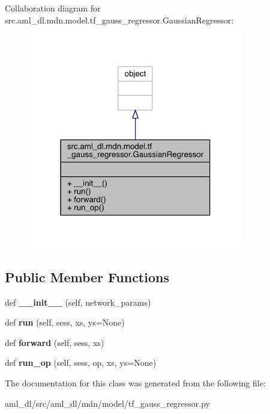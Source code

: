 Collaboration diagram for src.\+aml\+\_\+dl.\+mdn.\+model.\+tf\+\_\+gauss\+\_\+regressor.\+Gaussian\+Regressor\+:
\nopagebreak
\begin{figure}[H]
\begin{center}
\leavevmode
\includegraphics[width=267pt]{classsrc_1_1aml__dl_1_1mdn_1_1model_1_1tf__gauss__regressor_1_1_gaussian_regressor__coll__graph}
\end{center}
\end{figure}
\subsection*{Public Member Functions}
\begin{DoxyCompactItemize}
\item 
\hypertarget{classsrc_1_1aml__dl_1_1mdn_1_1model_1_1tf__gauss__regressor_1_1_gaussian_regressor_a4c80b2988737f5105daa84594d985724}{}\label{classsrc_1_1aml__dl_1_1mdn_1_1model_1_1tf__gauss__regressor_1_1_gaussian_regressor_a4c80b2988737f5105daa84594d985724} 
def {\bfseries \+\_\+\+\_\+init\+\_\+\+\_\+} (self, network\+\_\+params)
\item 
\hypertarget{classsrc_1_1aml__dl_1_1mdn_1_1model_1_1tf__gauss__regressor_1_1_gaussian_regressor_acc12f8257e881010aa7b96fe959456dd}{}\label{classsrc_1_1aml__dl_1_1mdn_1_1model_1_1tf__gauss__regressor_1_1_gaussian_regressor_acc12f8257e881010aa7b96fe959456dd} 
def {\bfseries run} (self, sess, xs, ys=None)
\item 
\hypertarget{classsrc_1_1aml__dl_1_1mdn_1_1model_1_1tf__gauss__regressor_1_1_gaussian_regressor_ae76839400b19f70f2d8c346c536a6264}{}\label{classsrc_1_1aml__dl_1_1mdn_1_1model_1_1tf__gauss__regressor_1_1_gaussian_regressor_ae76839400b19f70f2d8c346c536a6264} 
def {\bfseries forward} (self, sess, xs)
\item 
\hypertarget{classsrc_1_1aml__dl_1_1mdn_1_1model_1_1tf__gauss__regressor_1_1_gaussian_regressor_a93f219ac08506e0c4b51e5c06cd0948b}{}\label{classsrc_1_1aml__dl_1_1mdn_1_1model_1_1tf__gauss__regressor_1_1_gaussian_regressor_a93f219ac08506e0c4b51e5c06cd0948b} 
def {\bfseries run\+\_\+op} (self, sess, op, xs, ys=None)
\end{DoxyCompactItemize}


The documentation for this class was generated from the following file\+:\begin{DoxyCompactItemize}
\item 
aml\+\_\+dl/src/aml\+\_\+dl/mdn/model/tf\+\_\+gauss\+\_\+regressor.\+py\end{DoxyCompactItemize}
